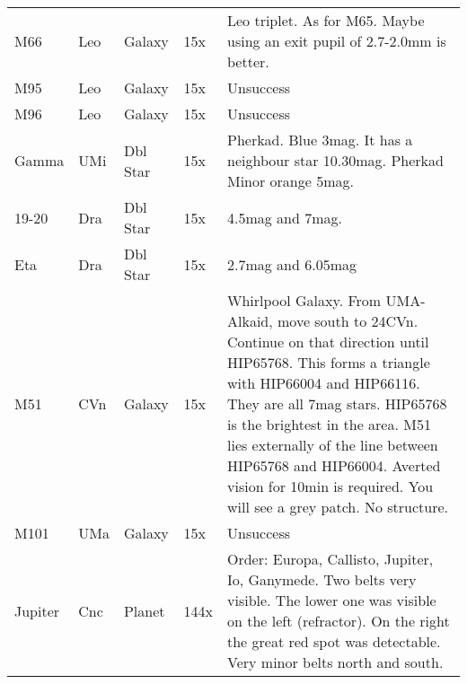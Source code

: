 \begin{longtable}{ p{0.7in}  p{0.3in}  p{0.6in}  p{0.9in}  p{5.8in} }
M66 & Leo & Galaxy & 15x & Leo triplet. As for M65. Maybe using an exit pupil of 2.7-2.0mm is better. \\ 
M95 & Leo & Galaxy & 15x & Unsuccess \\ 
M96 & Leo & Galaxy & 15x & Unsuccess \\ 
Gamma & UMi & Dbl Star & 15x & Pherkad. Blue 3mag. It has a neighbour star 10.30mag. Pherkad Minor orange 5mag. \\ 
19-20 & Dra & Dbl Star & 15x & 4.5mag and 7mag. \\ 
Eta & Dra & Dbl Star & 15x & 2.7mag and 6.05mag \\ 
M51 & CVn & Galaxy & 15x & Whirlpool Galaxy. From UMA-Alkaid, move south to 24CVn. Continue on that direction until HIP65768. This forms a triangle with HIP66004 and HIP66116. They are all 7mag stars. HIP65768 is the brightest in the area. M51 lies externally of the line between HIP65768 and HIP66004. Averted vision for 10min is required. You will see a grey patch. No structure. \\ 
M101 & UMa & Galaxy & 15x & Unsuccess \\ 
Jupiter & Cnc & Planet & 144x & Order: Europa, Callisto, Jupiter, Io, Ganymede. Two belts very visible. The lower one was visible on the left (refractor). On the right the great red spot was detectable. Very minor belts north and south.  \\ 
\hline 
\end{longtable} 
